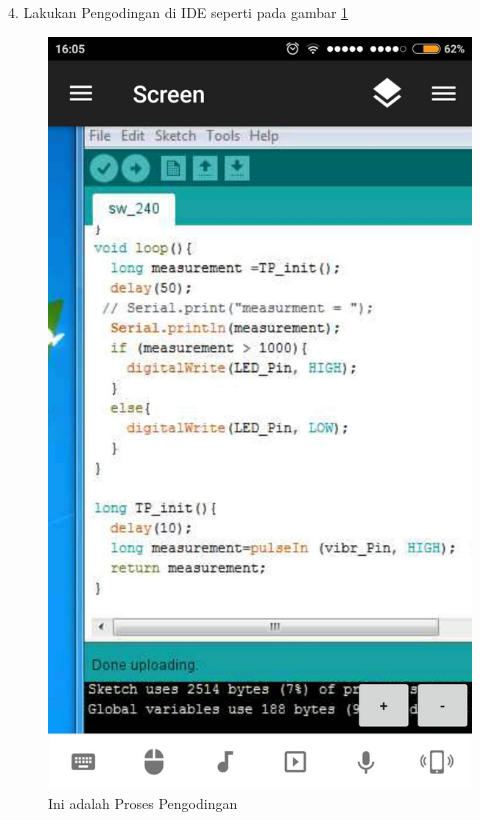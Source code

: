  4. Lakukan Pengodingan di IDE seperti pada gambar \ref{ar8}
  \begin{figure}[ht]
  \centerline{\includegraphics[width=.75\textwidth]{figures/ar8.jpg}}
  \caption{Ini adalah Proses Pengodingan}
  \label{ar8}
  \end{figure}

																											
